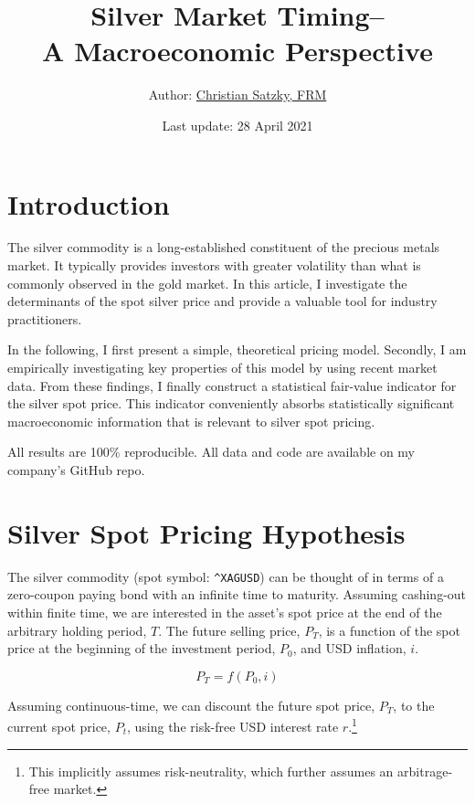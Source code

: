 \documentclass[
  12pt,
]{article}
\title{Silver Market Timing--\\
A Macroeconomic Perspective}
\author{Author: \href{https://www.linkedin.com/in/christian-satzky/}{Christian
Satzky, FRM}}
\date{Last update: 28 April 2021}
\begin{document}
\maketitle

\newpage
\hypersetup{linkcolor=black}
\tableofcontents
\newpage
\hypersetup{linkcolor=blue}

\hypertarget{introduction}{%
\section{Introduction}\label{introduction}}

The silver commodity is a long-established constituent of the precious
metals market. It typically provides investors with greater volatility
than what is commonly observed in the gold market. In this article, I
investigate the determinants of the spot silver price and provide a
valuable tool for industry practitioners.

In the following, I first present a simple, theoretical pricing model.
Secondly, I am empirically investigating key properties of this model by
using recent market data. From these findings, I finally construct a
statistical fair-value indicator for the silver spot price. This
indicator conveniently absorbs statistically significant macroeconomic
information that is relevant to silver spot pricing.

All results are 100\% reproducible. All data and code are available on
my company's GitHub repo.

\hypertarget{silver-spot-pricing-hypothesis}{%
\section{Silver Spot Pricing
Hypothesis}\label{silver-spot-pricing-hypothesis}}

The silver commodity (spot symbol: \texttt{\^{}XAGUSD}) can be thought
of in terms of a zero-coupon paying bond with an infinite time to
maturity. Assuming cashing-out within finite time, we are interested in
the asset's spot price at the end of the arbitrary holding period,
\(T\). The future selling price, \(P_T\), is a function of the spot
price at the beginning of the investment period, \(P_0\), and USD
inflation, \(i\).

\[P_{T} = f(P_{0}, i)\]

Assuming continuous-time, we can discount the future spot price,
\(P_T\), to the current spot price, \(P_t\), using the risk-free USD
interest rate \(r\).\footnote{This implicitly assumes risk-neutrality,
  which further assumes an arbitrage-free market.}
\end{document}
